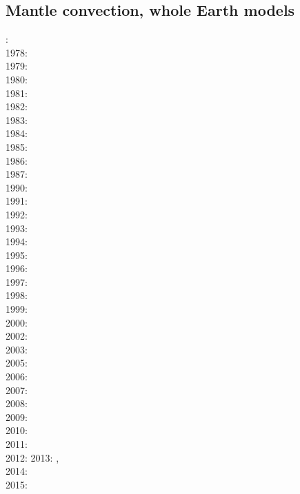 \cite{leka93}

\subsection*{Mantle convection, whole Earth models}

: \cite{hemw75}\\
1978: \cite{mahz78}\\
1979: \cite{ludt79}\cite{buss79}\\
1980: \cite{olco80}\cite{jamc80}\\
1981: \cite{buss81}\\
1982: \cite{jape82}\cite{homc82}\\
1983: \cite{hous83}\cite{hous83b}\cite{chri83}\\
1984: \cite{olyb84}\cite{jarv84}\cite{haeb84}\cite{harp84}\cite{davi84}\cite{boas84}\cite{chri84}
\cite{moca84}\\
1985: \cite{jarv85}\cite{baum85}\cite{chri85}\cite{csra85}\\
1986: \cite{davi86}\\
1987: \cite{yuqh87}\\
1990: \cite{trab90}\\
1991: \cite{chha91}\cite{mawe91}\\
1992: \cite{besg92}\cite{mayw92}\\
1993: \cite{zhch93}\cite{jarv93}\cite{tack93}\cite{bucc93}\cite{carm93}\\
1994: \cite{haeb94}\cite{chho94}\\
1995: \cite{zhgu95}\\
1996: \cite{zhyu96}\cite{hond96}\cite{rytr96a}\cite{rytr96b}\cite{tack96}\cite{trbo96}
\cite{birg96}\cite{burb96}\cite{kafo96}\\
1997: \cite{hond97}\cite{iwho97}\cite{burb97}\cite{mole97}\\
1998: \cite{ande98}\cite{iwho98}\cite{devv98}\cite{tack98}\cite{tack98b}\cite{trha98b}
\cite{trha98}\cite{burl98}\\
1999: \cite{duyr99}\\
2000: \cite{albe00}\cite{hayu00}\cite{devv00b}\cite{tack00b}\cite{zhzm00}\\
2002: \cite{tasu02}\cite{modm02}\\
2003: \cite{hapa03}\\
2005: \cite{taxn05}\cite{bupc05}\\
2006: \cite{beck06}\\
2007: \cite{nake07}\\
2008: \cite{tack08}\cite{chhl08}\\
2009: \cite{wodd09}\\
2010: \cite{bumb10}\\
2011: \cite{lowm11}\cite{rota11}\cite{woda11}\\
2012: \cite{bisa12}
2013: \cite{holj13}\cite{dadb13}\cite{toyd13},\cite{bogs13a}\cite{busa13}\cite{mika13}\\
2014: \cite{arfw14}\cite{helo14}\cite{crta14}\\
2015: \cite{thkp15}

